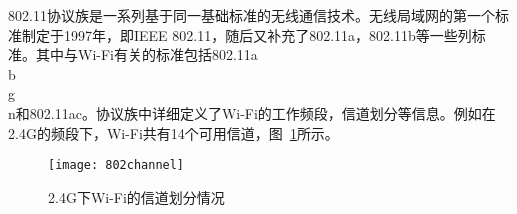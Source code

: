 802.11协议族是一系列基于同一基础标准的无线通信技术。无线局域网的第一个标准制定于1997年，即IEEE 802.11，随后又补充了802.11a，802.11b等一些列标准。其中与Wi-Fi有关的标准包括802.11a\\b\\g\\n和802.11ac。协议族中详细定义了Wi-Fi的工作频段，信道划分等信息。例如在2.4G的频段下，Wi-Fi共有14个可用信道，图~\ref{fig:802channel}所示。
\begin{figure}[htbp] %
  \centering
  \texttt{[image: 802channel]}
  \caption{2.4G下Wi-Fi的信道划分情况}
  \label{fig:802channel}
\end{figure}






















